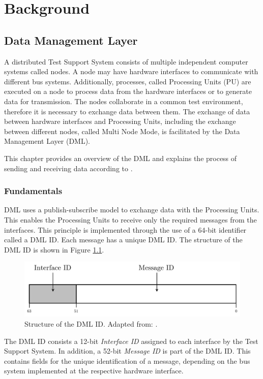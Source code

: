
\chapter{Background}

\section{Data Management Layer}
A distributed Test Support System consists of multiple independent computer systems called nodes. A node may have hardware interfaces to communicate with different bus systems. Additionally, processes, called Processing Units (PU) are executed on a node to process data from the hardware interfaces or to generate data for transmission. The nodes collaborate in a common test environment, therefore it is necessary to exchange data between them. The exchange of data between hardware interfaces and Processing Units, including the exchange between different nodes, called Multi Node Mode, is facilitated by the Data Management Layer (DML).

This chapter provides an overview of the DML and explains the process of sending and receiving data according to \cite{dml01}.

\subsection{Fundamentals}
DML uses a publish-subscribe model to exchange data with the Processing Units. This enables the Processing Units to receive only the required messages from the interfaces. This principle is implemented through the use of a 64-bit identifier called a DML ID. Each message has a unique DML ID.  The structure of the DML ID is shown in Figure \ref{fig:DmlId}.

\begin{figure}[h!]
    \centering
    \includegraphics[width=0.8\linewidth]{figures/dml/dml01.pdf}
    \caption[Structure of the DML ID]{Structure of the DML ID. Adapted from: \cite{dml01}.}
    \label{fig:DmlId}
\end{figure}

The DML ID consists a 12-bit \textit{Interface ID} assigned to each interface by the Test Support System. In addition, a 52-bit \textit{Message ID} is part of the DML ID. This contains fields for the unique identification of a message, depending on the bus system implemented at the respective hardware interface.

